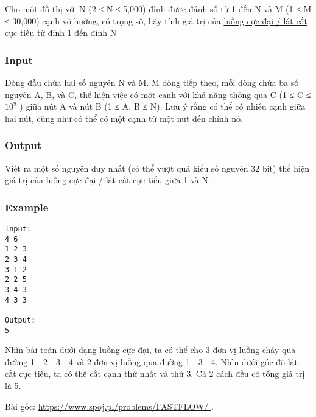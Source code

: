 



   Cho một đồ thị với N (2 ≤ N ≤ 5,000) đỉnh được đánh số từ 1 đến N và M (1 ≤ M ≤ 30,000) cạnh vô hướng, có trọng số, hãy tính giá trị của   \href{http://en.wikipedia.org/wiki/Maximum_flow_problem}{    luồng cực đại / lát cắt cực tiểu   }   từ đỉnh 1 đến đỉnh N  

\subsubsection{   Input  }

   Dòng đầu chứa hai số nguyên N và M. M dòng tiếp theo, mỗi dòng chứa ba số nguyên A, B, và C, thể hiện việc có một cạnh với khả năng thông qua C (1 ≤ C ≤ $10^{9}$   ) giữa nút A và nút B (1 ≤ A, B ≤ N). Lưu ý rằng có thể có nhiều cạnh giữa hai nút, cũng như có thể có một cạnh từ một nút đến chính nó.  

\subsubsection{   Output  }

   Viết ra một số nguyên duy nhất (có thể vượt quá kiểu số nguyên 32 bit) thể hiện giá trị của luồng cực đại / lát cắt cực tiểu giữa 1 và N.  

\subsubsection{   Example  }
\begin{verbatim}
Input:
4 6
1 2 3
2 3 4
3 1 2
2 2 5
3 4 3
4 3 3

Output:
5
\end{verbatim}

   Nhìn bài toán dưới dạng luồng cực đại, ta có thể cho 3 đơn vị luồng chảy qua đường 1 - 2 - 3 - 4 và 2 đơn vị luồng qua đường 1 - 3 - 4. Nhìn dưới góc độ lát cắt cực tiểu, ta có thể cắt cạnh thứ nhất và thứ 3. Cả 2 cách đều có tổng giá trị là 5.  

   Bài gốc:   \href{https://www.spoj.pl/problems/FASTFLOW/}{    https://www.spoj.pl/problems/FASTFLOW/   }   .  

